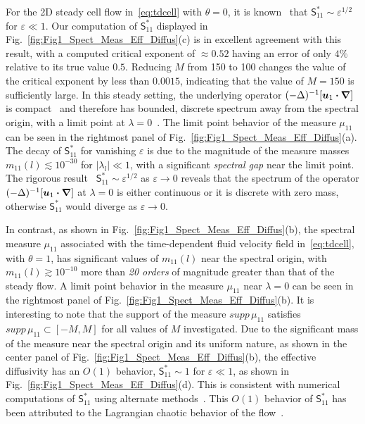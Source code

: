 \documentclass[leqno,onefignum,onetabnum]{siamltex1213}
\newcommand{\figref}[1]{Fig.~\ref{#1}}
\newcommand{\Sm}{\mathsf{S}}
\newcommand\bnabla{\mbox{\boldmath${\nabla}$}}
\providecommand\bcdot{\boldsymbol{\cdot}}
\newcommand{\vecu}{\boldsymbol{u}}
\begin{document}
For the 2D steady cell
flow in~\eqref{eq:tdcell} with $\theta=0$, it is
known~\cite{Fannjiang:1994:SIAM_JAM:333,Novikov:2005:CPAM:867} that
$\Sm^*_{11}\sim\varepsilon^{1/2}$ for $\varepsilon\ll1$. Our computation of $\Sm^*_{11}$
displayed in \figref{fig:Fig1_Spect_Meas_Eff_Diffus}(c) is in
excellent agreement with this result, with a computed critical
exponent of $\approx0.52$ having an error of only $4\%$ relative to its true
value $0.5$. Reducing $M$ from 150 to 100 changes the value of the
critical exponent by less than $0.0015$, indicating that the value of
$M=150$ is sufficiently large. In this steady setting, the underlying
operator $(-\Delta)^{-1}[\vecu_1\bcdot\bnabla]$ is
compact~\cite{Bhattacharya:AAP:1999:951} and therefore has 
bounded, discrete spectrum away from the spectral origin, with a limit
point at $\lambda=0$~\cite{Stakgold:BVP:2000}. The limit point behavior of  
the measure $\mu_{11}$ can be seen in the rightmost panel of
\figref{fig:Fig1_Spect_Meas_Eff_Diffus}(a). The decay of $\Sm^*_{11}$
for vanishing $\varepsilon$ is due to the magnitude of the measure masses
$m_{11}(l)\lesssim10^{-30}$ for $|\lambda_l|\ll1$, with a significant \emph{spectral
  gap} near the limit point. The rigorous
result~\cite{Fannjiang:1994:SIAM_JAM:333,Novikov:2005:CPAM:867} $\Sm^*_{11}\sim\varepsilon^{1/2}$ as
$\varepsilon\to0$ reveals that the spectrum of the operator
$(-\Delta)^{-1}[\vecu_1\bcdot\bnabla]$ at $\lambda=0$ is either
continuous or it is discrete with zero mass,
otherwise $\Sm^*_{11}$ would diverge as $\varepsilon\to0$.  



In contrast, as shown in \figref{fig:Fig1_Spect_Meas_Eff_Diffus}(b),
the spectral measure $\mu_{11}$ associated with the time-dependent fluid
velocity field in~\eqref{eq:tdcell}, with $\theta=1$, has significant
values of $m_{11}(l)$ near the spectral origin, with
$m_{11}(l)\gtrsim10^{-10}$ more than \emph{20 orders} of magnitude greater
than  that of the steady flow. A limit point behavior in the measure
$\mu_{11}$ near $\lambda=0$ can be seen in the rightmost panel of
\figref{fig:Fig1_Spect_Meas_Eff_Diffus}(b).  It is interesting to note
that the support of the measure $supp\,\mu_{11}$ satisfies
$supp\,\mu_{11}\subset[-M,M]$ for all values of $M$ investigated. Due to
the significant mass of the measure near the spectral origin and its
uniform nature, as shown in the center panel of
\figref{fig:Fig1_Spect_Meas_Eff_Diffus}(b), the effective diffusivity
has an $O(1)$ behavior, $\Sm^*_{11}\sim1$ for $\varepsilon\ll1$, as shown in
\figref{fig:Fig1_Spect_Meas_Eff_Diffus}(d). This is consistent with 
numerical computations of $\Sm^*_{11}$ using alternate 
methods~\cite{Biferale:PF:2725}. This $O(1)$ behavior of $\Sm^*_{11}$
has been attributed to the Lagrangian chaotic behavior of the
flow~\cite{Biferale:PF:2725,ZCX_2015}. 
\end{document}
